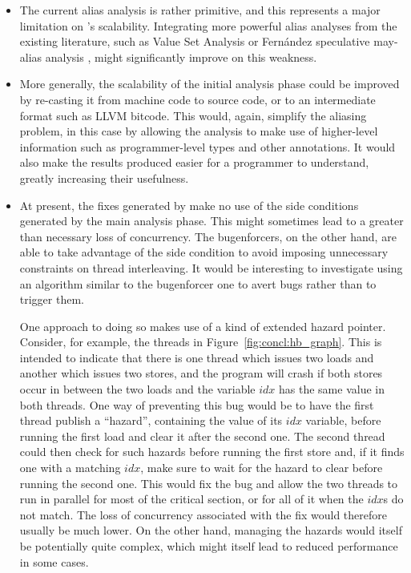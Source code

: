 \begin{itemize}
\item The current alias analysis is rather primitive, and this
  represents a major limitation on {\implementation}'s scalability.
  Integrating more powerful alias analyses from the existing
  literature, such as Value Set Analysis \cite{Balakrishnan2004} or
  Fern\'{a}ndez speculative may-alias analysis \cite{Fernandez2002},
  might significantly improve on this weakness.
\item More generally, the scalability of the initial analysis phase
  could be improved by re-casting it from machine code to source code,
  or to an intermediate format such as LLVM bitcode.  This would,
  again, simplify the aliasing problem, in this case by allowing the
  analysis to make use of higher-level information such as
  programmer-level types and other annotations.  It would also make
  the results produced {\technique} easier for a programmer to
  understand, greatly increasing their usefulness.
\item At present, the fixes generated by {\implementation} make no use
  of the side conditions generated by the main analysis phase.  This
  might sometimes lead to a greater than necessary loss of
  concurrency.  The \glspl{bugenforcer}, on the other hand, are able
  to take advantage of the side condition to avoid imposing
  unnecessary constraints on thread interleaving.  It would be
  interesting to investigate using an algorithm similar to the
  \gls{bugenforcer} one to avert bugs rather than to trigger them.
  
  One approach to doing so makes use of a kind of extended hazard
  pointer\cite{Michael2004}.  Consider, for example, the threads in
  Figure~\ref{fig:concl:hb_graph}.  This is intended to indicate that
  there is one thread which issues two loads and another which issues
  two stores, and the program will crash if both stores occur in
  between the two loads and the variable $\mathit{idx}$ has the same
  value in both threads.  One way of preventing this bug would be to
  have the first thread publish a ``hazard'', containing the value of
  its $\mathit{idx}$ variable, before running the first load and clear
  it after the second one.  The second thread could then check for
  such hazards before running the first store and, if it finds one
  with a matching $\mathit{idx}$, make sure to wait for the hazard to
  clear before running the second one.  This would fix the bug and
  allow the two threads to run in parallel for most of the critical
  section, or for all of it when the $\mathit{idx}$s do not match.
  The loss of concurrency associated with the fix would therefore
  usually be much lower.  On the other hand, managing the hazards
  would itself be potentially quite complex, which might itself lead
  to reduced performance in some cases.
\end{itemize}

